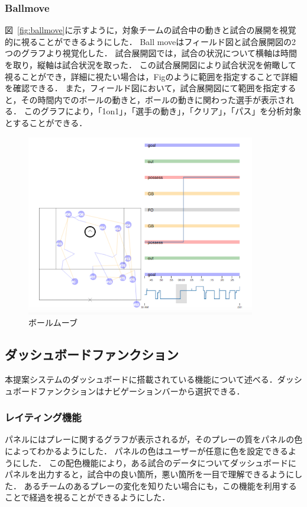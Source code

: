 \documentclass[sotsuron]{kuee}
\begin{document}
			\subsubsection{Ballmove}
				図~\ref{fig:ballmove}に示すように，対象チームの試合中の動きと試合の展開を視覚的に視ることができるようにした．
				Ball moveはフィールド図と試合展開図の2つのグラフより視覚化した．
				試合展開図では，試合の状況について横軸は時間を取り，縦軸は試合状況を取った．
				この試合展開図により試合状況を俯瞰して視ることができ，詳細に視たい場合は，Figのように範囲を指定することで詳細を確認できる．
				また，フィールド図において，試合展開図にて範囲を指定すると，その時間内でのボールの動きと，ボールの動きに関わった選手が表示される．
				このグラフにより，「1on1」，「選手の動き」，「クリア」，「パス」を分析対象とすることができる．
					\begin{figure}
						\begin{center}
							\includegraphics[width=10cm]{./png/ballmove.png}
						\end{center}
						\caption{ボールムーブ}
				  		\label{fig:basllmove}
					\end{figure}
		\subsection{ダッシュボードファンクション}
			本提案システムのダッシュボードに搭載されている機能について述べる．ダッシュボードファンクションはナビゲーションバーから選択できる．
			\subsubsection{レイティング機能}
			パネルにはプレーに関するグラフが表示されるが，そのプレーの質をパネルの色によってわかるようにした．
			パネルの色はユーザーが任意に色を設定できるようにした．
			この配色機能により，ある試合のデータについてダッシュボードにパネルを出力すると，試合中の良い箇所，悪い箇所を一目で理解できるようにした．
			あるチームのあるプレーの変化を知りたい場合にも，この機能を利用することで経過を視ることができるようにした．
\end{document}
